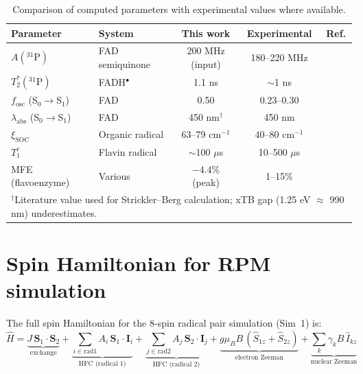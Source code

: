 \documentclass[11pt]{article}
\begin{document}
\begin{table}[htbp]
\centering
\caption{Comparison of computed parameters with experimental values where available.}
\label{tab:validation}
\small
\begin{tabular}{@{}llccc@{}}
\toprule
Parameter & System & This work & Experimental & Ref. \\
\midrule
$A(^{31}\mathrm{P})$ & FAD semiquinone & 200 MHz (input) & 180--220 MHz & \cite{Weber1998} \\
$T_2^*(^{31}\mathrm{P})$ & FADH$^\bullet$ & 1.1 ns & $\sim$1 ns & \cite{Weber1998} \\
$f_\mathrm{osc}$ (S$_0\to$S$_1$) & FAD & 0.50 & 0.23--0.30 & \cite{Islam2003} \\
$\lambda_\mathrm{abs}$ (S$_0\to$S$_1$) & FAD & 450 nm$^\dagger$ & 450 nm & \cite{Islam2003} \\
$\xi_\mathrm{SOC}$ & Organic radical & 63--79 cm$^{-1}$ & 40--80 cm$^{-1}$ & \cite{Marian2012} \\
$T_1^e$ & Flavin radical & $\sim$100 $\mu$s & 10--500 $\mu$s & \cite{Weber1998} \\
MFE (flavoenzyme) & Various & $-4.4\%$ (peak) & 1--15\% & \cite{Maeda2012} \\
\bottomrule
\multicolumn{5}{l}{\footnotesize $^\dagger$Literature value used for Strickler--Berg calculation; xTB gap (1.25 eV $\approx$ 990 nm) underestimates.}
\end{tabular}
\end{table}

\section{Spin Hamiltonian for RPM simulation}

The full spin Hamiltonian for the 8-spin radical pair simulation (Sim~1) is:
\begin{equation}
\hat{H} = \underbrace{J\,\mathbf{S}_1 \cdot \mathbf{S}_2}_{\text{exchange}} + \underbrace{\sum_{i \in \mathrm{rad1}} A_i\,\mathbf{S}_1 \cdot \mathbf{I}_i}_{\text{HFC (radical 1)}} + \underbrace{\sum_{j \in \mathrm{rad2}} A_j\,\mathbf{S}_2 \cdot \mathbf{I}_j}_{\text{HFC (radical 2)}} + \underbrace{g\mu_B B\,(\hat{S}_{1z} + \hat{S}_{2z})}_{\text{electron Zeeman}} + \underbrace{\sum_k \gamma_k B\,\hat{I}_{kz}}_{\text{nuclear Zeeman}}
\end{equation}
\end{document}
